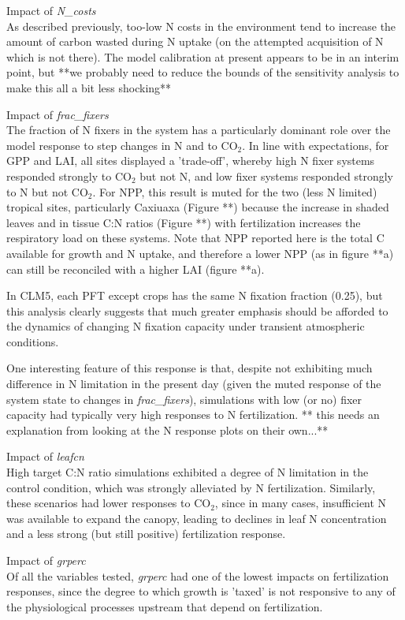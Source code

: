 \documentclass[draft,linenumbers]{agujournal}
\begin{document}
Impact of \emph{N\_costs}\\
As described previously, too-low N costs in the environment tend to increase the amount of carbon wasted during N uptake (on the attempted acquisition of N which is not there).  The model calibration at present appears to be in an interim point, but **we probably need to reduce the bounds of the sensitivity analysis to make this all a bit less shocking**

Impact of \emph{frac\_fixers}\\
The fraction of N fixers in the system has a particularly dominant role over the model response to step changes in N and to CO$_{2}$. In line with expectations, for GPP and LAI, all sites displayed a 'trade-off', whereby high N fixer systems responded strongly to CO$_{2}$ but not N, and low fixer systems responded strongly to N but not CO$_{2}$. For NPP, this result is muted for the two (less N limited) tropical sites, particularly Caxiuaxa (Figure **) because the increase in shaded leaves and in tissue C:N ratios (Figure **) with fertilization increases the respiratory load on these systems.  Note that NPP reported here is the total C available for growth and N uptake, and therefore a lower NPP (as in figure **a) can still be reconciled with a higher LAI (figure **a).

In CLM5, each PFT except crops has the same N fixation fraction (0.25), but this analysis clearly suggests that much greater emphasis should be afforded to the dynamics of changing N fixation capacity under transient atmospheric conditions.

One interesting feature of this response is that, despite not exhibiting much difference in N limitation in the present day (given the muted response of the system state to changes in \emph{frac\_fixers}), simulations with low (or no) fixer capacity had typically very high responses to N fertilization.  ** this needs an explanation from looking at the N response plots on their own...**

Impact of \emph{leafcn}\\
 High target C:N ratio simulations exhibited a degree of N limitation in the control condition, which was strongly alleviated by N fertilization. Similarly, these scenarios had lower responses to CO$_{2}$, since in many cases, insufficient N was available to expand the canopy, leading to declines in leaf N concentration and a less strong (but still positive) fertilization response. 

Impact of \emph{grperc}\\
Of all the variables tested, \emph{grperc} had one of the lowest impacts on fertilization responses, since the degree to which growth is 'taxed' is not responsive to any of the physiological processes upstream that depend on fertilization.
\end{document}
